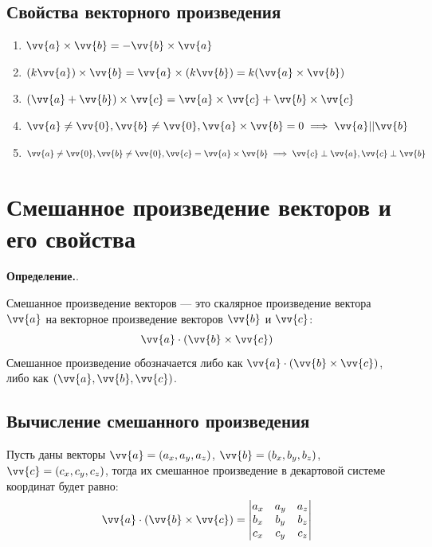 \documentclass[a4paper,12pt]{extbook}
\newcommand{\newpar}{$ $\par\nobreak\ignorespaces}
\newenvironment{definition}[1][]{\noindent\textbf{Определение.}\if\relax\detokenize{#1}\relax\else\;#1.\newpar\fi\;}{\bigskip}
\theoremstyle{numbered}
\theoremstyle{named}
\theoremstyle{named}
\theoremstyle{named}
\begin{document}
\subsection*{Свойства векторного произведения}%
\label{sub:Свойства векторного произведения}

\begin{enumerate}
    \item {\(\vv{a} \times \vv{b} = - \vv{b} \times \vv{a}\)}

    \item {\((k \vv{a}) \times \vv{b} = \vv{a} \times (k \vv{b}) = k(\vv{a} \times \vv{b})\)}

    \item {\((\vv{a} + \vv{b}) \times \vv{c} = \vv{a} \times \vv{c} + \vv{b} \times \vv{c}\)}

    \item {\(\vv{a} \neq \vv{0}, \vv{b} \neq \vv{0}, \vv{a} \times \vv{b} = 0 \implies \vv{a} || \vv{b}\)}

    \item {\(\vv{a} \neq \vv{0}, \vv{b} \neq \vv{0}, \vv{c} = \vv{a} \times \vv{b} \implies \vv{c} \perp \vv{a}, \vv{c} \perp \vv{b} \)}
\end{enumerate}

\section{Смешанное произведение векторов и его свойства}%
\label{sec:Смешанное произведение векторов и его свойства}

\begin{definition}
    Смешанное произведение векторов — это скалярное произведение вектора \(\vv{a}\) на векторное произведение векторов \(\vv{b}\) и \(\vv{c}\):
    \[
        \vv{a} \cdot (\vv{b} \times \vv{c})
    \]
    Смешанное произведение обозначается либо как \(\vv{a} \cdot (\vv{b} \times \vv{c})\), либо как \((\vv{a}, \vv{b}, \vv{c})\).
\end{definition}

\subsection*{Вычисление смешанного произведения}%
\label{sub:Вычисление смешанного произведения}

Пусть даны векторы \(\vv{a} = (a_x, a_y, a_z)\), \(\vv{b} = (b_x, b_y, b_z)\), \(\vv{c} = (c_x, c_y, c_z)\), тогда их смешанное произведение в декартовой системе координат будет равно:
\[
    \vv{a} \cdot (\vv{b} \times \vv{c}) =
    \begin{vmatrix}
        a_x & a_y & a_z \\
        b_x & b_y & b_z \\
        c_x & c_y & c_z
    \end{vmatrix}
\]
\end{document}
